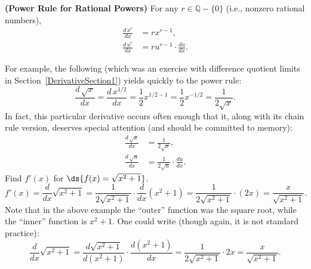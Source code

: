 \begin{theorem}{\rm\bf(Power Rule for Rational Powers)}
For any $r\in\mathbb{Q}-\{0\}$ (i.e., nonzero rational numbers), 
\begin{align}
\frac{d\,x^r}{dx}&= rx^{r-1},\label{RationalPowerRuleEquation}\\
\frac{d\, u^r}{dx}&=ru^{r-1}\cdot\frac{du}{dx}.
\label{ChainRuleVersionOfPowerRule}\end{align}
\label{PowerRuleForRationalPowers}\end{theorem}
\bex For example, the following (which was an exercise with
difference quotient limits in Section~\ref{DerivativeSection1})
yields quickly to the power rule:
$$\frac{d\,\sqrt{x}}{dx}=\frac{d\,x^{1/2}}{dx}
=\frac12x^{1/2-1}=\frac12x^{-1/2}=\frac1{2\sqrt{x}}.$$
\eex
In fact, this particular derivative occurs often enough
that it, along with its chain rule 
version, deserves special attention
(and should be committed to memory):
\begin{align}
\frac{d\,\sqrt{x}}{dx}&=\frac1{2\sqrt{x}},\\
 \frac{d\,\sqrt{u}}{dx}&=\frac{1}{2\sqrt{u}}\cdot\frac{du}{dx}.
\end{align}
\bex Find $f'(x)$ for $\ds{f(x)=\sqrt{x^2+1}}$.
$$f'(x)=\frac{d}{dx}\sqrt{x^2+1}=\frac1{2\sqrt{x^2+1}}\cdot\frac{d}{dx}
\left(x^2+1\right)=\frac1{2\sqrt{x^2+1}}\cdot(2x)
=\frac{x}{\sqrt{x^2+1}}.$$\eex
Note that in the above example
the ``outer'' function was the square root, while
the ``inner'' function is $x^2+1$.  One could write (though
again, it is not standard practice):
$$\frac{d}{dx}\sqrt{x^2+1}=
 \frac{d\sqrt{x^2+1}}{d(x^2+1)}\cdot\frac{d(x^2+1)}{dx}
=\frac1{2\sqrt{x^2+1}}\cdot2x=\frac{x}{\sqrt{x^2+1}}.$$

